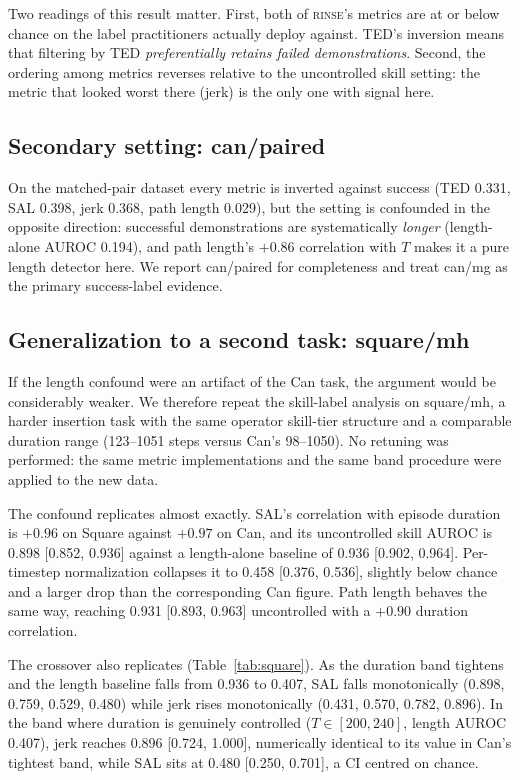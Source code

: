\documentclass{article}
\newcommand{\rinse}{\textsc{rinse}}
\begin{document}
Two readings of this result matter. First, both of \rinse{}'s metrics are at
or below chance on the label practitioners actually deploy against. TED's
inversion means that filtering by TED \emph{preferentially retains failed
demonstrations}. Second, the ordering among metrics reverses relative to the
uncontrolled skill setting: the metric that looked worst there (jerk) is the
only one with signal here.

\subsection{Secondary setting: can/paired}

On the matched-pair dataset every metric is inverted against success (TED
0.331, SAL 0.398, jerk 0.368, path length 0.029), but the setting is
confounded in the opposite direction: successful demonstrations are
systematically \emph{longer} (length-alone AUROC 0.194), and path length's
$+0.86$ correlation with $T$ makes it a pure length detector here. We
report can/paired for completeness and treat can/mg as the primary
success-label evidence.

\subsection{Generalization to a second task: square/mh}
\label{sec:square}

If the length confound were an artifact of the Can task, the argument would
be considerably weaker. We therefore repeat the skill-label analysis on
square/mh, a harder insertion task with the same operator skill-tier
structure and a comparable duration range (123--1051 steps versus Can's
98--1050). No retuning was performed: the same metric implementations and
the same band procedure were applied to the new data.

The confound replicates almost exactly. SAL's correlation with episode
duration is $+0.96$ on Square against $+0.97$ on Can, and its uncontrolled
skill AUROC is 0.898 [0.852, 0.936] against a length-alone baseline of 0.936
[0.902, 0.964]. Per-timestep normalization collapses it to 0.458 [0.376,
0.536], slightly below chance and a larger drop than the corresponding Can
figure. Path length behaves the same way, reaching 0.931 [0.893, 0.963]
uncontrolled with a $+0.90$ duration correlation.

The crossover also replicates (Table~\ref{tab:square}). As the duration band
tightens and the length baseline falls from 0.936 to 0.407, SAL falls
monotonically (0.898, 0.759, 0.529, 0.480) while jerk rises monotonically
(0.431, 0.570, 0.782, 0.896). In the band where duration is genuinely
controlled ($T \in [200,240]$, length AUROC 0.407), jerk reaches 0.896
[0.724, 1.000], numerically identical to its value in Can's tightest band,
while SAL sits at 0.480 [0.250, 0.701], a CI centred on chance.
\end{document}
